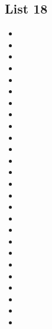 \documentclass[a4paper,10pt]{article}
\begin{document}
\begin{CJK*}{UTF8}{gkai}
\newpage
\section{List 18}
\begin{itemize}
\item 
\item 
\item 
\item 
\item 
\item 
\item 
\item 
\item 
\item 
\item 
\item 
\item 
\item 
\item 
\item 
\item 
\item 
\item 
\item 
\item 
\item 
\item 
\item 
\item 
\item 
\end{itemize}

\newpage

\end{CJK*}
\end{document}
